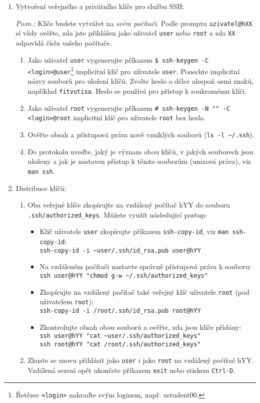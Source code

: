 \documentclass[a4paper,11pt]{article}
\begin{document}
\begin{enumerate}
  \item Vytvoření veřejného a privátního klíče pro službu SSH:

  {\em Pozn.:} Klíče budete vytvářet na {\em svém počítači}. Podle promptu \verb|uzivatel@hXX| si vždy ověřte, zda jste přihlášen jako uživatel {\tt user} nebo {\tt root} a zda \verb|XX| odpovídá číslu vašeho počítače.
    \begin{enumerate}
      \item Jako uživatel {\tt user} vygenerujte příkazem \verb|$ ssh-keygen -C <login>@user|\footnote{Řetězec {\tt <login>} nahraďte svým loginem, např. xstudent00.} implicitní klíč pro uživatele {\tt user}. Ponechte implicitní názvy souborů pro uložení klíčů. Zvolte heslo o délce alespoň osmi znaků, například \texttt{fitvutisa}. Heslo se používá pro přístup k soukromému klíči.
      \item Jako uživatel {\tt root} vygenerujte příkazem \verb|# ssh-keygen -N "" -C <login>@root|
        implicitní klíč pro uživatele {\tt root} bez hesla.
      \item Ověřte obsah a přístupová práva nově vzniklých souborů (\verb|ls -l ~/.ssh|).
      \item Do protokolu uveďte, jaký je význam obou klíčů, v jakých souborech jsou uloženy a jak je nastaven přístup k těmto souborům (unixová práva), viz {\tt man ssh}.
    \end{enumerate}

  \item Distribuce klíčů:
    \begin{enumerate}
      \item Oba veřejné klíče zkopírujte na vzdálený počítač hYY do souboru \verb|.ssh/authorized_keys|. Můžete využít následující postup:
        \begin{itemize}
          \item Klíč uživatele {\tt user} zkopírujte příkazem {\tt ssh-copy-id}, viz {\tt man ssh-copy-id}: \\
            {\verb&ssh-copy-id -i ~user/.ssh/id_rsa.pub user@hYY&}
          \item Na vzdáleném počítači nastavte správně přístupová práva k souboru:\\
            {\verb&ssh user@hYY "chmod g-w ~/.ssh/authorized_keys"&} 
          \item Zkopírujte na vzdálený počítač také veřejný klíč uživatele {\tt root} (pod uživatelem {\tt root}): \\
            {\verb&ssh-copy-id -i /root/.ssh/id_rsa.pub root@hYY&}
          \item Zkontrolujte obsah obou souborů a ověřte, zda jsou klíče přidány: \\
            {\verb&ssh user@hYY "cat ~user/.ssh/authorized_keys"&} \\
            {\verb&ssh root@hYY "cat /root/.ssh/authorized_keys"&}
        \end{itemize}
      \item Zkuste se znovu přihlásit jako \texttt{user} i jako \texttt{root} na vzdálený počítač hYY.
      Vzdálená sezení opět ukončete příkazem {\tt exit} nebo stiskem {\tt Ctrl-D}.


\end{enumerate}
\end{enumerate}
\end{document}
